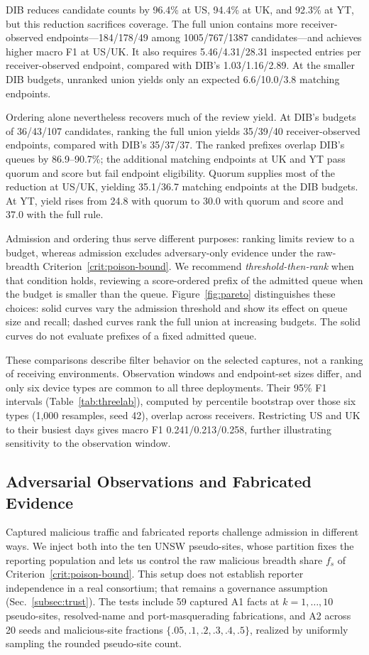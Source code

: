 \documentclass[journal]{IEEEtran}
\theoremstyle{definition}
\begin{document}
DIB reduces candidate counts by 96.4\% at US, 94.4\% at UK, and 92.3\% at YT, but this reduction sacrifices coverage. The full union contains more receiver-observed endpoints---184/178/49 among 1005/767/1387 candidates---and achieves higher macro F1 at US/UK. It also requires 5.46/4.31/28.31 inspected entries per receiver-observed endpoint, compared with DIB's 1.03/1.16/2.89. At the smaller DIB budgets, unranked union yields only an expected 6.6/10.0/3.8 matching endpoints.

Ordering alone nevertheless recovers much of the review yield. At DIB's budgets of 36/43/107 candidates, ranking the full union yields 35/39/40 receiver-observed endpoints, compared with DIB's 35/37/37. The ranked prefixes overlap DIB's queues by 86.9--90.7\%; the additional matching endpoints at UK and YT pass quorum and score but fail endpoint eligibility. Quorum supplies most of the reduction at US/UK, yielding 35.1/36.7 matching endpoints at the DIB budgets. At YT, yield rises from 24.8 with quorum to 30.0 with quorum and score and 37.0 with the full rule.

Admission and ordering thus serve different purposes: ranking limits review to a budget, whereas admission excludes adversary-only evidence under the raw-breadth Criterion~\ref{crit:poison-bound}. We recommend \emph{threshold-then-rank} when that condition holds, reviewing a score-ordered prefix of the admitted queue when the budget is smaller than the queue. Figure~\ref{fig:pareto} distinguishes these choices: solid curves vary the admission threshold and show its effect on queue size and recall; dashed curves rank the full union at increasing budgets. The solid curves do not evaluate prefixes of a fixed admitted queue.


These comparisons describe filter behavior on the selected captures, not a ranking of receiving environments. Observation windows and endpoint-set sizes differ, and only six device types are common to all three deployments. Their 95\% F1 intervals (Table~\ref{tab:threelab}), computed by percentile bootstrap over those six types (1,000 resamples, seed 42), overlap across receivers. Restricting US and UK to their busiest days gives macro F1 0.241/0.213/0.258, further illustrating sensitivity to the observation window.


\subsection{Adversarial Observations and Fabricated Evidence}
\label{sec:security-results}
Captured malicious traffic and fabricated reports challenge admission in different ways. We inject both into the ten UNSW pseudo-sites, whose partition fixes the reporting population and lets us control the raw malicious breadth share $f_s$ of Criterion~\ref{crit:poison-bound}. This setup does not establish reporter independence in a real consortium; that remains a governance assumption (Sec.~\ref{subsec:trust}). The tests include 59 captured A1 facts at $k=1,\ldots,10$ pseudo-sites, resolved-name and port-masquerading fabrications, and A2 across 20 seeds and malicious-site fractions $\{.05,.1,.2,.3,.4,.5\}$, realized by uniformly sampling the rounded pseudo-site count.
\end{document}
